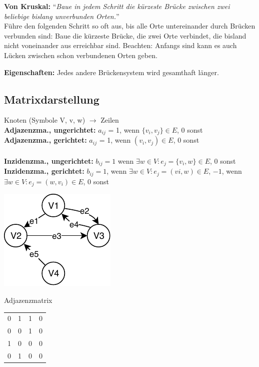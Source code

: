 \documentclass[8pt,landscape]{scrartcl}
\begin{document}
\begin{multicols}{3}
\textbf{Von Kruskal:} ``\textit{Baue in jedem Schritt die k\"urzeste Br\"ucke zwischen zwei beliebige bislang unverbunden Orten.}''\\
F\"uhre den folgenden Schritt so oft aus, bis alle Orte untereinander durch Br\"ucken verbunden sind: Baue die k\"urzeste Br\"ucke, die zwei Orte verbindet, die bisland nicht voneinander aus erreichbar sind.
Beachten: Anfangs sind kann es auch L\"ucken zwischen schon verbundenen Orten geben.

\textbf{Eigenschaften:} Jedes andere Br\"uckensystem wird gesamthaft l\"anger.



\subsection{Matrixdarstellung}
Knoten (Symbole V, v, w) $\rightarrow$ Zeilen\\
\textbf{Adjazenzma., ungerichtet:} $a_{ij}$ = 1, wenn $\{v_i, v_j\} \in E$, 0 sonst\\
\textbf{Adjazenzma., gerichtet:} $a_{ij}$ = 1, wenn $(v_i, v_j) \in E$, 0 sonst\\\\ 
\textbf{Inzidenzma., ungerichtet:} $b_{ij} = 1$ wenn $\exists w \in V: e_j = \{v_i, w \} \in E$, 0 sonst\\
\textbf{Inzidenzma., gerichtet:} $b_{ij} = 1$, wenn $\exists w \in V : e_j = (vi, w) \in E$, $-1$, wenn $\exists w \in V: e_j = (w, v_i) \in E$, 0 sonst

\includegraphics[width=0.5\linewidth]{inzidenz.pdf}

Adjazenzmatrix\\
\begin{tabular}{llll}
0 & 1 & 1 & 0\\
0 & 0 & 1 & 0\\
1 & 0 & 0 & 0\\
0 & 1 & 0 & 0
\end{tabular}



\end{multicols}
\end{document}
